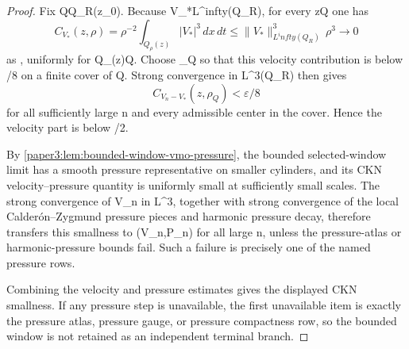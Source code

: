 \documentclass[11pt]{amsart}
\def\({}%
\def\){}%
\def\infty{infty}%
\theoremstyle{plain}
\theoremstyle{definition}
\theoremstyle{remark}
\begin{document}
\begin{proof}
Fix \(Q\Subset Q_R(z_0)\).  Because \(V_*\in L^\infty(Q_R)\), for every
\(z\in Q\) one has
\[
   C_{V_*}(z,\rho)
   =\rho^{-2}\int_{Q_\rho(z)}|V_*|^3\,dx\,dt
   \le \|V_*\|_{L^\infty(Q_R)}^3\,\rho^3\to0
\]
as \(\rho{}\), uniformly for \(Q_\rho(z)\Subset Q\).  Choose
\(\rho_Q\) so that this velocity contribution is below \(\varepsilon/8\) on a
finite cover of \(Q\).  Strong convergence in \(L^3(Q_R)\) then gives
\[
   C_{V_n-V_*}(z,\rho_Q)<\varepsilon/8
\]
for all sufficiently large \(n\) and every admissible center in the cover.
Hence the velocity part is below \(\varepsilon/2\).

By \cref{paper3:lem:bounded-window-vmo-pressure}, the bounded selected-window
limit has a smooth pressure representative on smaller cylinders, and its CKN
velocity--pressure quantity is uniformly small at sufficiently small scales.
The strong convergence of \(V_n\) in \(L^3\), together with strong convergence
of the local Calder\'on--Zygmund pressure pieces and harmonic pressure decay,
therefore transfers this smallness to \((V_n,P_n)\) for all large \(n\),
unless the pressure-atlas or harmonic-pressure bounds fail.  Such a failure is
precisely one of the named pressure rows.

Combining the velocity and pressure estimates gives the displayed CKN
smallness.  If any pressure step is unavailable, the first unavailable item is
exactly the pressure atlas, pressure gauge, or pressure compactness row, so
the bounded window is not retained as an independent terminal branch.
\end{proof}
\end{document}
